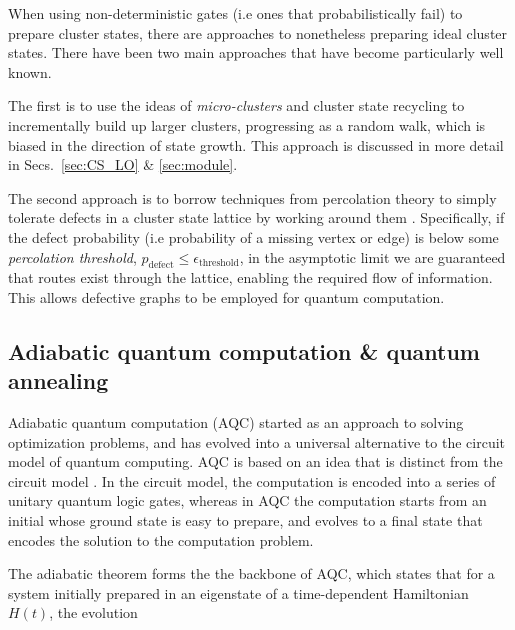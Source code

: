 When using non-deterministic gates (i.e ones that probabilistically fail) to prepare cluster states, there are approaches to nonetheless preparing ideal cluster states. There have been two main approaches that have become particularly well known. 

The first is to use the ideas of \textit{micro-clusters} and cluster state recycling to incrementally build up larger clusters, progressing as a random walk, which is biased in the direction of state growth. This approach is discussed in more detail in Secs.~\ref{sec:CS_LO} \& \ref{sec:module}.

The second approach is to borrow techniques from percolation theory to simply tolerate defects in a cluster state lattice by working around them \cite{Brown}. Specifically, if the defect probability (i.e probability of a missing vertex or edge) is below some \textit{percolation threshold}, \mbox{$p_\mathrm{defect}\leq \epsilon_\mathrm{threshold}$}, in the asymptotic limit we are guaranteed that routes exist through the lattice, enabling the required flow of information. This allows defective graphs to be employed for quantum computation.

%
%

\subsection{Adiabatic quantum computation \& quantum annealing} \label{sec:adiabatic_QC}  


Adiabatic quantum computation (AQC) started as an approach to solving optimization problems, and has evolved into a universal alternative to the circuit model of quantum computing. 
AQC is based on an idea that is distinct from the circuit model \cite{RevModPhys.90.015002}. In the circuit model, the computation is encoded into a series of unitary quantum logic gates, whereas in AQC the computation starts from an initial whose ground state is easy to prepare, and evolves to a final state that encodes  the solution to the computation problem.


The adiabatic theorem forms the the backbone of AQC, which states that for a system initially prepared in an eigenstate of a time-dependent Hamiltonian $H(t)$, the evolution 

